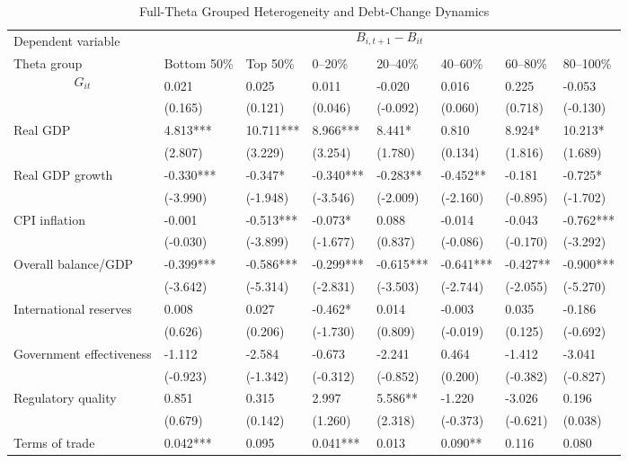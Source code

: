 \begin{table}[H]\centering
\begin{threeparttable}
\caption{Full-Theta Grouped Heterogeneity and Debt-Change Dynamics}
\label{tab:theta_group_heterogeneity_debt}
\scriptsize
\begin{tabularx}{\textwidth}{lYYYYYYY}
\toprule
Dependent variable &  \\
\cmidrule(lr){2-8}
Theta group & Bottom 50\% & Top 50\% & 0--20\% & 20--40\% & 40--60\% & 60--80\% & 80--100\% \\
\midrule
$$G_{it}$$ & 0.021 & 0.025 & 0.011 & -0.020 & 0.016 & 0.225 & -0.053 \\
  & (0.165) & (0.121) & (0.046) & (-0.092) & (0.060) & (0.718) & (-0.130) \\
Real GDP & 4.813*** & 10.711*** & 8.966*** & 8.441* & 0.810 & 8.924* & 10.213* \\
  & (2.807) & (3.229) & (3.254) & (1.780) & (0.134) & (1.816) & (1.689) \\
Real GDP growth & -0.330*** & -0.347* & -0.340*** & -0.283** & -0.452** & -0.181 & -0.725* \\
  & (-3.990) & (-1.948) & (-3.546) & (-2.009) & (-2.160) & (-0.895) & (-1.702) \\
CPI inflation & -0.001 & -0.513*** & -0.073* & 0.088 & -0.014 & -0.043 & -0.762*** \\
  & (-0.030) & (-3.899) & (-1.677) & (0.837) & (-0.086) & (-0.170) & (-3.292) \\
Overall balance/GDP & -0.399*** & -0.586*** & -0.299*** & -0.615*** & -0.641*** & -0.427** & -0.900*** \\
  & (-3.642) & (-5.314) & (-2.831) & (-3.503) & (-2.744) & (-2.055) & (-5.270) \\
International reserves & 0.008 & 0.027 & -0.462* & 0.014 & -0.003 & 0.035 & -0.186 \\
  & (0.626) & (0.206) & (-1.730) & (0.809) & (-0.019) & (0.125) & (-0.692) \\
Government effectiveness & -1.112 & -2.584 & -0.673 & -2.241 & 0.464 & -1.412 & -3.041 \\
  & (-0.923) & (-1.342) & (-0.312) & (-0.852) & (0.200) & (-0.382) & (-0.827) \\
Regulatory quality & 0.851 & 0.315 & 2.997 & 5.586** & -1.220 & -3.026 & 0.196 \\
  & (0.679) & (0.142) & (1.260) & (2.318) & (-0.373) & (-0.621) & (0.038) \\
Terms of trade & 0.042*** & 0.095 & 0.041*** & 0.013 & 0.090** & 0.116 & 0.080 \\

\end{tabularx}
\end{threeparttable}
\end{table}
